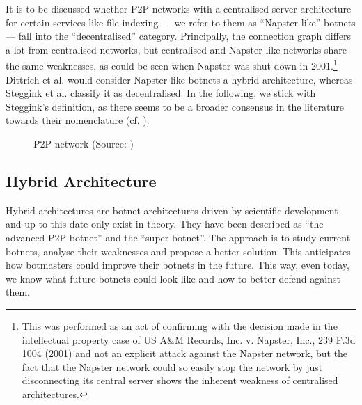 \documentclass{llncs}
\begin{document}
It is to be discussed whether P2P networks with a centralised server
architecture for certain services like file-indexing --- we refer to
them as ``Napster-like'' botnets --- fall into the ``decentralised''
category. Principally, the connection graph differs a lot from
centralised networks, but centralised and Napster-like networks share
the same weaknesses, as could be seen when Napster was shut down in
2001\cite{napsterWiki}.\footnote{This was performed as an act of
  confirming with the decision made in the intellectual property case
  of US A&M Records, Inc. v. Napster, Inc., 239 F.3d 1004 (2001) and
  not an explicit attack against the Napster network, but the fact
  that the Napster network could so easily stop the network by just
  disconnecting its central server shows the inherent weakness of
  centralised architectures.}  Dittrich et
al. \cite{dittrich2007command} would consider Napster-like botnets a
hybrid architecture, whereas Steggink et al.
\cite{steggink2007detection} classify it as decentralised. In the
following, we stick with Steggink's definition, as there seems to be a
broader consensus in the literature towards their nomenclature
(cf. \cite{td1sc}).

\begin{figure}[htbp]
  \centering
  \caption{P2P network (Source: \cite{dittrich2007command})}
  \label{p2p-network}
\end{figure}


\subsection{Hybrid Architecture}
\label{hybrid}
Hybrid architectures are botnet architectures driven by scientific
development and up to this date only exist in theory. They have been
described as ``the advanced P2P botnet''\cite{td1sc} and the ``super
botnet''\cite{vogt2007army}. The approach is to study current botnets,
analyse their weaknesses and propose a better solution. This
anticipates how botmasters could improve their botnets in the
future. This way, even today, we know what future botnets could look
like and how to better defend against them.
\end{document}
